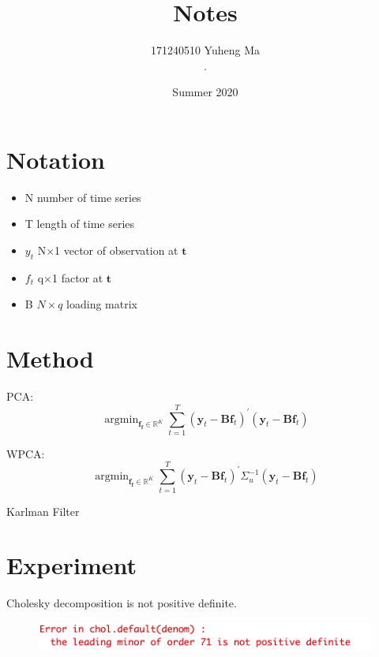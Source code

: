 \documentclass[10pt, oneside]{article}
\title{
Notes
}
\author{171240510 Yuheng Ma\\[0.3cm]{.}}
\date{Summer 2020}
\begin{document}
\maketitle

\vspace{.25in}

\section*{Notation}
\begin{itemize}
\item N number of time series
\item T length of time series
\item $y_t$ N$\times$1 vector of observation at $\mathbf{t}$
\item $f_t$ q$\times$1 factor at $\mathbf{t}$
\item B $N\times q$ loading matrix
\end{itemize}

\section*{Method}
PCA:
\begin{equation}
\operatorname{argmin}_{\mathbf{f}_{\mathbf{f}} \in \mathbb{R}^{K}} \sum_{t=1}^{T}\left(\mathbf{y}_{t}-\mathbf{B f}_{t}\right)^{\prime}\left(\mathbf{y}_{t}-\mathbf{B} \mathbf{f}_{t}\right)
\end{equation}
\par
WPCA:
\begin{equation}
\operatorname{argmin}_{\mathbf{f}_{\mathbf{f}} \in \mathbb{R}^{K}} \sum_{t=1}^{T}\left(\mathbf{y}_{t}-\mathbf{B f}_{t}\right)^{\prime} \Sigma_{u}^{-1}\left(\mathbf{y}_{t}-\mathbf{B} \mathbf{f}_{t}\right)
\end{equation}

\par 
Karlman Filter



\section*{Experiment}

Cholesky decomposition is not positive definite. 
\begin{figure}[H]

  \includegraphics[width=\linewidth]{error.png}

  \label{fig: error}
    \end{figure}
\end{document}

